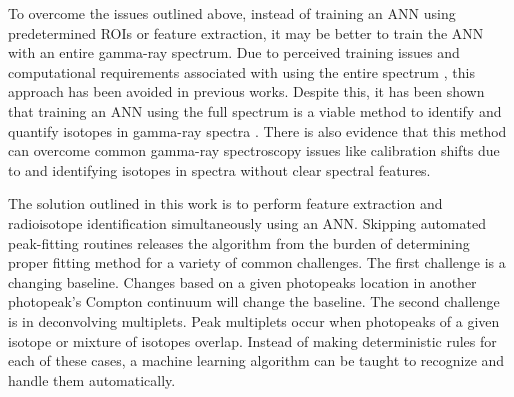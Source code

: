 To overcome the issues outlined above, instead of training an ANN using predetermined ROIs or feature extraction, it may be better to train the ANN with an entire gamma-ray spectrum. Due to perceived training issues and computational requirements associated with using the entire spectrum \cite{Pilato1999,Yoshida2002}, this approach has been avoided in previous works. Despite this, it has been shown that training an ANN using the full spectrum is a viable method to identify and quantify isotopes in gamma-ray spectra \cite{kamuda2017,kamudaThesis2017,kamuda2018}. There is also evidence that this method can overcome common gamma-ray spectroscopy issues like calibration shifts due to and identifying isotopes in spectra without clear spectral features.

The solution outlined in this work is to perform feature extraction and radioisotope identification simultaneously using an ANN. Skipping automated peak-fitting routines releases the algorithm from the burden of determining proper fitting method for a variety of common challenges. The first challenge is a changing baseline. Changes based on a given photopeaks location in another photopeak's Compton continuum will change the baseline. The second challenge is in deconvolving multiplets. Peak multiplets occur when photopeaks of a given isotope or mixture of isotopes overlap. Instead of making deterministic rules for each of these cases, a machine learning algorithm can be taught to recognize and handle them automatically.


